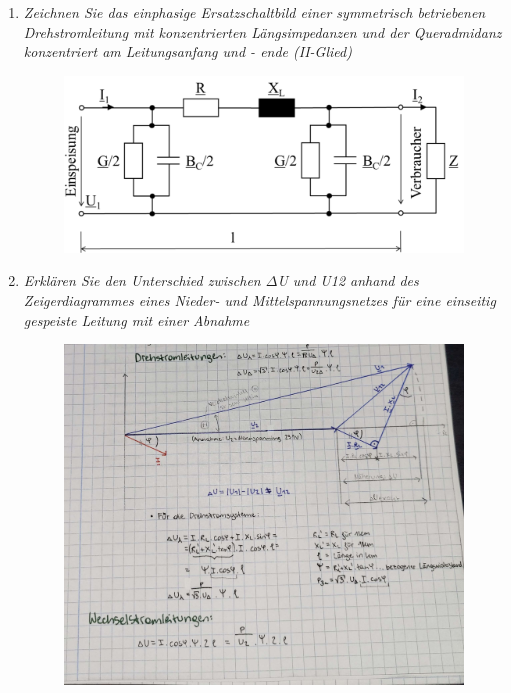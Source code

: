 \documentclass[12pt]{article}
\begin{document}
\begin{enumerate}
    \item \textit{Zeichnen Sie das einphasige Ersatzschaltbild einer 
    symmetrisch betriebenen Drehstromleitung mit 
    konzentrierten Längsimpedanzen und der 
    Queradmidanz konzentriert am Leitungsanfang und -
    ende (II-Glied)}\\

    \begin{figure}[h]
        \includegraphics[width=\textwidth]{figures/II-Glied.PNG}
        \centering
    \end{figure}

    \item \textit{Erklären Sie den Unterschied zwischen $\Delta$U und 
    U12 anhand des Zeigerdiagrammes eines Nieder- und Mittelspannungsnetzes für eine einseitig 
    gespeiste Leitung mit einer Abnahme}\\

    \begin{figure}[h]
        \includegraphics[width=\textwidth]{figures/Zeiger.jpg}
        \centering
    \end{figure}



\end{enumerate}
\end{document}
